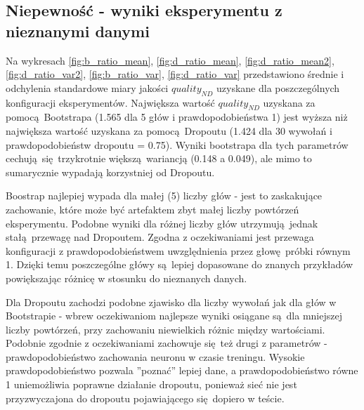 \subsection{Niepewność - wyniki eksperymentu z nieznanymi danymi}

Na wykresach \ref{fig:b_ratio_mean}, \ref{fig:d_ratio_mean}, \ref{fig:d_ratio_mean2}, \ref{fig:d_ratio_var2}, \ref{fig:b_ratio_var}, \ref{fig:d_ratio_var} przedstawiono średnie i odchylenia standardowe miary jakości $quality_{ND}$ uzyskane dla poszczególnych konfiguracji eksperymentów. Największa wartość $quality_{ND}$ uzyskana za pomocą Bootstrapa (1.565 dla 5 głów i prawdopodobieństwa 1) jest wyższa niż największa wartość uzyskana za pomocą Dropoutu (1.424 dla 30 wywołań i prawdopodobieństw dropoutu = 0.75). Wyniki bootstrapa dla tych parametrów cechują się trzykrotnie większą wariancją (0.148 a 0.049), ale mimo to sumarycznie wypadają korzystniej od Dropoutu.

Boostrap najlepiej wypada dla małej (5) liczby głów - jest to zaskakujące zachowanie, które może być artefaktem zbyt małej liczby powtórzeń eksperymentu. Podobne wyniki dla różnej liczby głów utrzymują jednak stałą przewagę nad Dropoutem. Zgodna z oczekiwaniami jest przewaga konfiguracji z prawdopodobieństwem uwzględnienia przez głowę próbki równym 1. Dzięki temu poszczególne główy są lepiej dopasowane do znanych przykładów powiększając różnicę w stosunku do nieznanych danych.

Dla Dropoutu zachodzi podobne zjawisko dla liczby wywołań jak dla głów w Bootstrapie - wbrew oczekiwaniom najlepsze wyniki osiągane są dla mniejszej liczby powtórzeń, przy zachowaniu niewielkich różnic między wartościami. Podobnie zgodnie z oczekiwaniami zachowuje się też drugi z parametrów - prawdopodobieństwo zachowania neuronu w czasie treningu. Wysokie prawdopodobieństwo pozwala ''poznać'' lepiej dane, a prawdopodobieństwo równe 1 uniemożliwia poprawne działanie dropoutu, ponieważ sieć nie jest przyzwyczajona do dropoutu pojawiającego się dopiero w teście.

